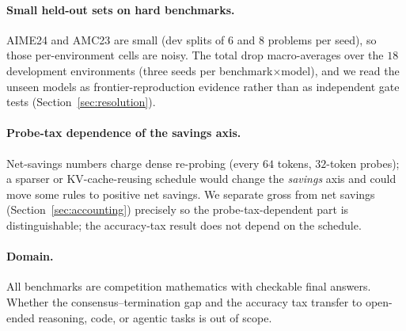 \paragraph{Small held-out sets on hard benchmarks.}
AIME24 and AMC23 are small (dev splits of $6$ and $8$ problems per seed), so
those per-environment cells are noisy.
The total drop macro-averages over the $18$ development environments (three seeds
per benchmark$\times$model), and we read the unseen models as
frontier-reproduction evidence rather than as independent gate tests
(Section~\ref{sec:resolution}).

\paragraph{Probe-tax dependence of the savings axis.}
Net-savings numbers charge dense re-probing (every $64$ tokens, $32$-token
probes); a sparser or KV-cache-reusing schedule would change the \emph{savings}
axis and could move some rules to positive net savings. We separate gross from
net savings (Section~\ref{sec:accounting}) precisely so the probe-tax-dependent
part is distinguishable; the accuracy-tax result does not depend on the schedule.

\paragraph{Domain.}
All benchmarks are competition mathematics with checkable final answers. Whether
the consensus--termination gap and the accuracy tax transfer to open-ended reasoning, code, or
agentic tasks is out of scope.
